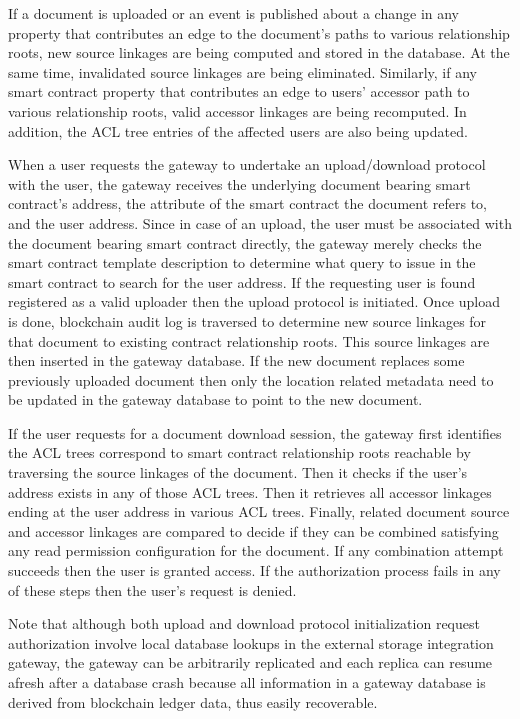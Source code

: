 If a document is uploaded or an event is published about a change in any property that contributes an edge to the document's paths to various relationship roots, new source linkages are being computed and stored in the database. At the same time, invalidated source linkages are being eliminated. Similarly, if any smart contract property that contributes an edge to users' accessor path to various relationship roots, valid accessor linkages are being recomputed. In addition, the ACL tree entries of the affected users are also being updated.

When a user requests the gateway to undertake an upload/download protocol with the user, the gateway receives the underlying document bearing smart contract's address, the attribute of the smart contract the document refers to, and the user address. Since in case of an upload, the user must be associated with the document bearing smart contract directly, the gateway merely checks the smart contract template description to determine what query to issue in the smart contract to search for the user address. If the requesting user is found registered as a valid uploader then the upload protocol is initiated. Once upload is done, blockchain audit log is traversed to determine new source linkages for that document to existing contract relationship roots. This source linkages are then inserted in the gateway database. If the new document replaces some previously uploaded document then only the location related metadata need to be updated in the gateway database to point to the new document.       

If the user requests for a document download session, the gateway first identifies the ACL trees correspond to smart contract relationship roots reachable by traversing the source linkages of the document. Then it checks if the user's address exists in any of those ACL trees. Then it retrieves all accessor linkages ending at the user address in various ACL trees. Finally, related document source and accessor linkages are compared to decide if they can be combined satisfying any read permission configuration for the document. If any combination attempt succeeds then the user is granted access. If the authorization process fails in any of these steps then the user's request is denied.          
        
Note that although both upload and download protocol initialization request authorization involve local database lookups in the external storage integration gateway, the gateway can be arbitrarily replicated and each replica can resume afresh after a database crash because all information in a gateway database is derived from blockchain ledger data, thus easily recoverable.          
             
